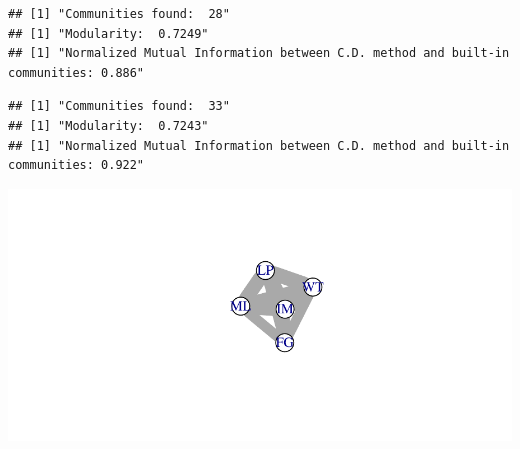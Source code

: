 \documentclass[
]{article}
\newenvironment{Shaded}{\begin{snugshade}}{\end{snugshade}}
\newcommand{\AttributeTok}[1]{\textcolor[rgb]{0.77,0.63,0.00}{#1}}
\newcommand{\CommentTok}[1]{\textcolor[rgb]{0.56,0.35,0.01}{\textit{#1}}}
\newcommand{\ConstantTok}[1]{\textcolor[rgb]{0.00,0.00,0.00}{#1}}
\newcommand{\DecValTok}[1]{\textcolor[rgb]{0.00,0.00,0.81}{#1}}
\newcommand{\FloatTok}[1]{\textcolor[rgb]{0.00,0.00,0.81}{#1}}
\newcommand{\FunctionTok}[1]{\textcolor[rgb]{0.00,0.00,0.00}{#1}}
\newcommand{\NormalTok}[1]{#1}
\newcommand{\OtherTok}[1]{\textcolor[rgb]{0.56,0.35,0.01}{#1}}
\newcommand{\SpecialCharTok}[1]{\textcolor[rgb]{0.00,0.00,0.00}{#1}}
\newcommand{\StringTok}[1]{\textcolor[rgb]{0.31,0.60,0.02}{#1}}
\begin{document}
\begin{verbatim}
## [1] "Communities found:  28"
## [1] "Modularity:  0.7249"
## [1] "Normalized Mutual Information between C.D. method and built-in communities: 0.886"
\end{verbatim}

\begin{Shaded}
\end{Shaded}

\begin{verbatim}
## [1] "Communities found:  33"
## [1] "Modularity:  0.7243"
## [1] "Normalized Mutual Information between C.D. method and built-in communities: 0.922"
\end{verbatim}

\includegraphics{com_det_algorithms_files/figure-latex/unnamed-chunk-31-1.pdf}
\end{document}
